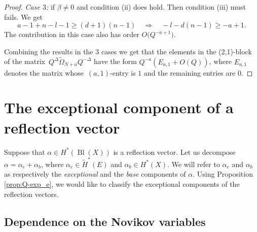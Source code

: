 \documentclass[pdftex]{sigma}
\numberwithin{equation}{section}
\begin{document}
\begin{proof}
{\em Case $3$:} if $\beta\neq 0$ and condition (ii) does hold. Then
condition (iii) must fails. We get
\[
a-1+n-l-1\geq (d+1)(n-1)\quad \Rightarrow\quad
-l-d(n-1) \geq -a+1.
\]
The contribution in this case also has order $O\big(Q^{-a+1}\big)$.

Combining the results in the 3 cases we get that the elements in the
(2,1)-block of the matrix~${Q^\Delta \widetilde{\Omega}_{N+a}
Q^{-\Delta}}$ have the form $Q^{-a} (E_{a,1} +O(Q))$, where $E_{a,1}$
denotes the matrix whose~$(a,1)$-entry is $1$ and the remaining
entries are $0$.
\end{proof}

\section{The exceptional component of a reflection vector}
\label{sec:qexp_mon}

Suppose that $\alpha \in  H^* (\operatorname{Bl}(X))$ is a reflection vector. Let us decompose $\alpha=\alpha_e+\alpha_b$, where ${\alpha_e \in  \widetilde{H}^* (E)}$ and $\alpha_b\in H^*(X)$. We will refer to $\alpha_e$ and $\alpha_b$ as respectively the {\em exceptional} and the {\em base} components of $\alpha$. Using Proposition \ref{prop:Q-exp_e}, we would like to classify the exceptional components of the reflection vectors.

\subsection{Dependence on the Novikov variables}
\label{sec:rv_qdep}
\end{document}
